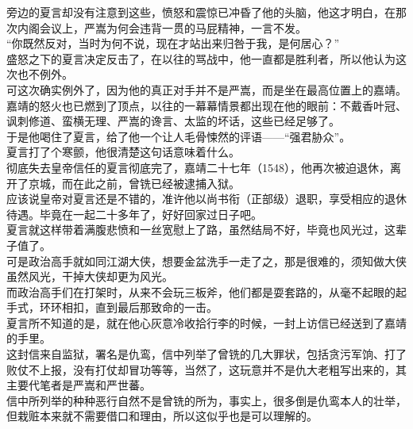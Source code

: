\begin{multicols}{\theparacolNo}
旁边的夏言却没有注意到这些，愤怒和震惊已冲昏了他的头脑，他这才明白，在那次内阁会议上，严嵩为何会违背一贯的马屁精神，一言不发。\\

“你既然反对，当时为何不说，现在才站出来归咎于我，是何居心？”\\

盛怒之下的夏言决定反击了，在以往的骂战中，他一直都是胜利者，所以他认为这次也不例外。\\

可这次确实例外了，因为他的真正对手并不是严嵩，而是坐在最高位置上的嘉靖。\\

嘉靖的怒火也已燃到了顶点，以往的一幕幕情景都出现在他的眼前：不戴香叶冠、讽刺修道、蛮横无理、严嵩的谗言、太监的坏话，这些已经足够了。\\

于是他喝住了夏言，给了他一个让人毛骨悚然的评语——“强君胁众”。\\

夏言打了个寒颤，他很清楚这句话意味着什么。\\

彻底失去皇帝信任的夏言彻底完了，嘉靖二十七年（1548），他再次被迫退休，离开了京城，而在此之前，曾铣已经被逮捕入狱。\\

应该说皇帝对夏言还是不错的，准许他以尚书衔（正部级）退职，享受相应的退休待遇。毕竟在一起二十多年了，好好回家过日子吧。\\

夏言就这样带着满腹悲愤和一丝宽慰上了路，虽然结局不好，毕竟也风光过，这辈子值了。\\

可是政治高手就如同江湖大侠，想要金盆洗手一走了之，那是很难的，须知做大侠虽然风光，干掉大侠却更为风光。\\

而政治高手们在打架时，从来不会玩三板斧，他们都是耍套路的，从毫不起眼的起手式，环环相扣，直到最后那致命的一击。\\

夏言所不知道的是，就在他心灰意冷收拾行李的时候，一封上访信已经送到了嘉靖的手里。\\

这封信来自监狱，署名是仇鸾，信中列举了曾铣的几大罪状，包括贪污军饷、打了败仗不上报，没有打仗却冒功等等，当然了，这玩意并不是仇大老粗写出来的，其主要代笔者是严嵩和严世蕃。\\

信中所列举的种种恶行自然不是曾铣的所为，事实上，很多倒是仇鸾本人的壮举，但栽赃本来就不需要借口和理由，所以这似乎也是可以理解的。\\


\end{multicols}
